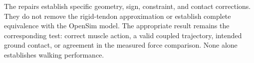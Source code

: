 The repairs establish specific geometry, sign, constraint, and contact corrections. They do not remove the rigid-tendon approximation or establish complete equivalence with the OpenSim model. The appropriate result remains the corresponding test: correct muscle action, a valid coupled trajectory, intended ground contact, or agreement in the measured force comparison. None alone establishes walking performance.

